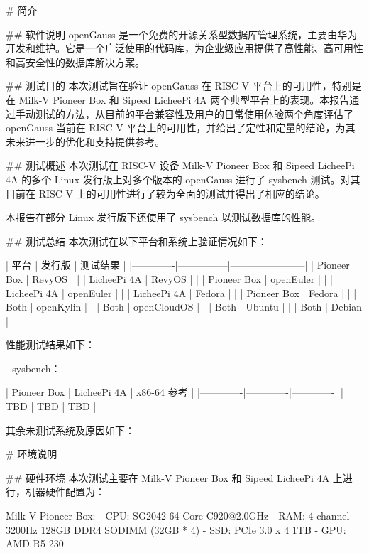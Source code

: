 \documentclass{article}
\begin{document}
\begin{markdown}

# 简介

## 软件说明
openGauss 是一个免费的开源关系型数据库管理系统，主要由华为开发和维护。它是一个广泛使用的代码库，为企业级应用提供了高性能、高可用性和高安全性的数据库解决方案。

## 测试目的
本次测试旨在验证 openGauss 在 RISC-V 平台上的可用性，特别是在 Milk-V Pioneer Box 和 Sipeed LicheePi 4A 两个典型平台上的表现。本报告通过手动测试的方法，从目前的平台兼容性及用户的日常使用体验两个角度评估了 openGauss 当前在 RISC-V 平台上的可用性，并给出了定性和定量的结论，为其未来进一步的优化和支持提供参考。

## 测试概述
本次测试在 RISC-V 设备 Milk-V Pioneer Box 和 Sipeed LicheePi 4A 的多个 Linux 发行版上对多个版本的 openGauss 进行了 sysbench 测试。对其目前在 RISC-V 上的可用性进行了较为全面的测试并得出了相应的结论。

本报告在部分 Linux 发行版下还使用了 sysbench 以测试数据库的性能。

## 测试总结
本次测试在以下平台和系统上验证情况如下：

| 平台        | 发行版        | 测试结果              |
|-------------|---------------|-----------------------|
| Pioneer Box | RevyOS        |                       |
| LicheePi 4A | RevyOS        |                       |
| Pioneer Box | openEuler     |                       |
| LicheePi 4A | openEuler     |                       |
| LicheePi 4A | Fedora        |                       |
| Pioneer Box | Fedora        |                       |
| Both        | openKylin     |                       |
| Both        | openCloudOS   |                       |
| Both        | Ubuntu        |                       |
| Both        | Debian        |                       |

性能测试结果如下：

- sysbench：

| Pioneer Box | LicheePi 4A | x86-64 参考 |
|-------------|-------------|-------------|
|    TBD      |    TBD      |     TBD     |

其余未测试系统及原因如下：

# 环境说明

## 硬件环境
本次测试主要在 Milk-V Pioneer Box 和 Sipeed LicheePi 4A 上进行，机器硬件配置为：

Milk-V Pioneer Box:
- CPU: SG2042 64 Core C920@2.0GHz
- RAM: 4 channel 3200Hz 128GB DDR4 SODIMM (32GB * 4)
- SSD: PCIe 3.0 x 4 1TB
- GPU: AMD R5 230


\end{markdown}
\end{document}
